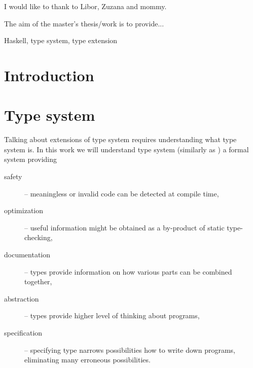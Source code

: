 \documentclass[11pt,oneside,draft]{fithesis2}
\renewcommand{\to}{\mathrel{\mathop{\chemarrow}}}
\theoremstyle{definition}
\begin{document}
\FrontMatter
\ThesisTitlePage

\begin{ThesisDeclaration}
\DeclarationText
\AdvisorName
\end{ThesisDeclaration}

\begin{ThesisThanks}
I would like to thank to Libor, Zuzana and mommy.
\end{ThesisThanks}

\begin{ThesisAbstract}
The aim of the master's thesis/work is to provide...
\end{ThesisAbstract}

\begin{ThesisKeyWords}
Haskell, type system, type extension
\end{ThesisKeyWords}

\clearpage
{}
\tableofcontents
\listoffigures

\MainMatter

\chapter{Introduction}

\chapter{Type system}


Talking about extensions of type system requires understanding what type system is.
In this work we will understand type system (similarly as
\cite{pierce:2002:types,barendregt:1992:lambdaProc}) a formal system providing

\begin{description}
	\item[safety] -- meaningless or invalid code can be detected at compile time,
	\item[optimization] -- useful information might be obtained as a by-product of static type-checking,
	\item[documentation] -- types provide information on how various parts can be combined together,
	\item[abstraction] -- types provide higher level of thinking about programs,
	\item[specification] -- specifying type narrows possibilities how to write down programs,
		eliminating many erroneous possibilities.
\end{description}
\end{document}
